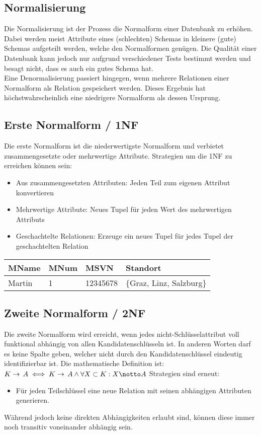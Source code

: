 \documentclass{article}
\begin{document}
	\subsection{Normalisierung}
	Die Normalisierung ist der Prozess die Normalform einer Datenbank zu erhöhen. Dabei werden meist Attribute eines (schlechten) Schemas in kleinere (gute) Schemas aufgeteilt werden, welche den Normalformen genügen. Die Qualität einer Datenbank kann jedoch nur aufgrund verschiedener Tests bestimmt werden und besagt nicht, dass es auch ein gutes Schema hat. \\
	Eine Denormalisierung passiert hingegen, wenn mehrere Relationen einer Normalform als Relation gespeichert werden. Dieses Ergebnis hat höchstwahrscheinlich eine niedrigere Normalform als dessen Ursprung.
	\subsection{Erste Normalform / 1NF}
	Die erste Normalform ist die niederwertigste Normalform und verbietet zusammengesetzte oder mehrwertige Attribute. Strategien um die 1NF zu erreichen können sein:
	\begin{itemize}
		\item{Aus zusammengesetzten Attributen: Jeden Teil zum eigenen Attribut konvertieren}
		\item{Mehrwertige Attribute: Neues Tupel für jeden Wert des mehrwertigen Attributs}
		\item{Geschachtelte Relationen: Erzeuge ein neues Tupel für jedes Tupel der geschachtelten Relation}
	\end{itemize}
	\begin{tabular}{| l | l | l | l |}
		\toprule
		MName & MNum & MSVN & Standort \\ \midrule
		Martin & 1 & 12345678 & \{Graz, Linz, Salzburg\} \\ \hline
		
		\bottomrule
	\end{tabular}
	\subsection{Zweite Normalform / 2NF}
	Die zweite Normalform wird erreicht, wenn jedes nicht-Schlüsselattribut voll funktional abhängig von allen Kandidatenschlüsseln ist. In anderen Worten darf es keine Spalte geben, welcher nicht durch den Kandidatenschlüssel eindeutig identifizierbar ist. Die mathematische Definition ist: $K \to\, A \iff K \to\, A \land \forall X \subset K:X \notto A$
	Strategien sind erneut:
	\begin{itemize}
		\item{Für jeden Teilschlüssel eine neue Relation mit seinen abhängigen Attributen generieren.}
	\end{itemize}
	Während jedoch keine direkten Abhängigkeiten erlaubt sind, können diese immer noch transitiv voneinander abhängig sein.
\end{document}
